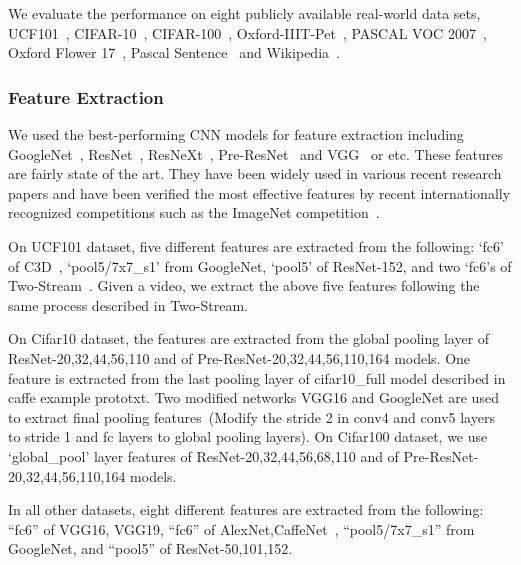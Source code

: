 \documentclass[letterpaper]{article} %
\begin{document}
We evaluate the performance on eight publicly available real-world data sets,
UCF101~\cite{UCF101}, CIFAR-10~\cite{krizhevsky2009learning}, CIFAR-100~\cite{krizhevsky2009learning}, Oxford-IIIT-Pet~\cite{parkhi2012cats}, PASCAL VOC 2007~\cite{pascal-voc-2007}, Oxford Flower 17~\cite{nilsback2006visual}, Pascal Sentence~\cite{rashtchian2010collecting} and Wikipedia~\cite{rasiwasia2010new}.

\subsubsection{Feature Extraction}

We used the best-performing CNN models for feature extraction including GoogleNet~\cite{szegedy2015going}, ResNet~\cite{he2015deep}, ResNeXt~\cite{xie2016aggregated}, Pre-ResNet~\cite{he2016identity} and VGG~\cite{chatfield2014return} or etc.
These features are fairly state of the art.
They have been widely used in various recent research papers and have been verified the most effective features by recent internationally recognized competitions such as the ImageNet competition~\cite{russakovsky2015imagenet}.

On UCF101 dataset, five different features are extracted from the following:
`fc6' of C3D~\cite{tran2015learning}, `pool5/7x7\_s1' from GoogleNet, `pool5' of ResNet-152, and two `fc6's of Two-Stream~\cite{simonyan2014two}.
Given a video, we extract the above five features following the same process described in Two-Stream.

On Cifar10 dataset, the features are extracted from the global pooling layer of ResNet-20,32,44,56,110 and of Pre-ResNet-20,32,44,56,110,164 models.
One feature is extracted from the last pooling layer of cifar10\_full model described in caffe example prototxt.
Two modified networks VGG16 and GoogleNet are used to extract final pooling features~(Modify the stride 2 in conv4 and conv5 layers to stride 1 and fc layers to global pooling layers).
On Cifar100 dataset, we use `global\_pool' layer features of ResNet-20,32,44,56,68,110 and of Pre-ResNet-20,32,44,56,110,164 models.

In all other datasets, eight different features are extracted from the following: ``fc6'' of VGG16, VGG19, 
``fc6'' of AlexNet,CaffeNet~\cite{krizhevsky2012imagenet},
``pool5/7x7\_s1'' from GoogleNet, and ``pool5'' of ResNet-50,101,152.
\end{document}
